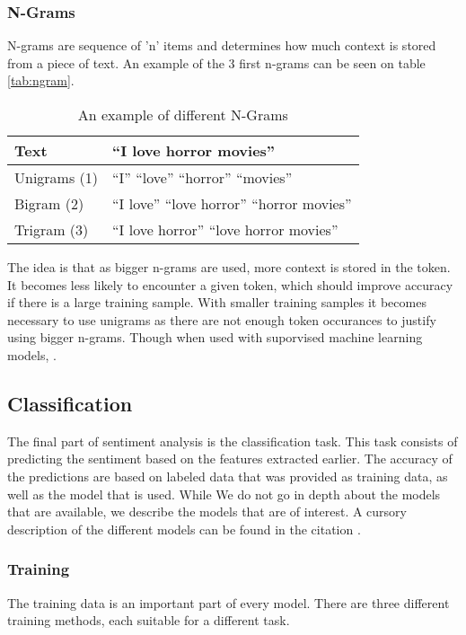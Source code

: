 \subsubsection{N-Grams}
N-grams are sequence of 'n' items and determines how much context is stored
from a piece of text. An example of the 3 first n-grams can be seen on table
\autoref{tab:ngram}. 

\begin{table}[H]
\centering
\begin{tabular}{|l|l|}
\hline
Text & ``I love horror movies'' \\ \hline
Unigrams (1) &
``I'' ``love'' ``horror'' ``movies''
\\ \hline 
Bigram (2) &
``I love'' ``love horror'' ``horror movies''
\\ \hline
Trigram (3) &
``I love horror'' ``love horror movies''
\\ \hline
\end{tabular}
\caption{An example of different N-Grams}
\label{tab:ngram}
\end{table}

The idea is that as bigger n-grams are used, more context is stored in the
token. It becomes less likely to encounter a given token, which should
improve accuracy if there is a large training sample. With smaller training
samples it becomes necessary to use unigrams as there are not enough
token occurances to justify using bigger n-grams. Though when used with
suporvised machine learning models, 
\citep{NGrams}.


\subsection{Classification}
The final part of sentiment analysis is the classification task. This task
consists of predicting the sentiment based on the features extracted earlier.
The accuracy of the predictions are based on labeled data that was provided as
training data, as well as the model that is used. While We do not go in depth
about the models that are available, we describe the models that are of
interest. A cursory description of the different models can be found in the
citation \citep{Classification}.

\subsubsection{Training}
The training data is an important part of every model. There are three different
training methods, each suitable for a different task. 

